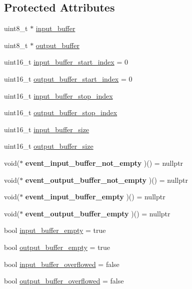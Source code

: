 \subsection*{Protected Attributes}
\begin{DoxyCompactItemize}
\item 
uint8\+\_\+t $\ast$ \hyperlink{class_stream_a81139fc126566f9d42470fdb405ed26a}{input\+\_\+buffer}
\item 
uint8\+\_\+t $\ast$ \hyperlink{class_stream_a3cd072a10ad5c1b6308dd2da2cdbec71}{output\+\_\+buffer}
\item 
uint16\+\_\+t \hyperlink{class_stream_a6fc009e9e71fa92cbbf9b407ede82a73}{input\+\_\+buffer\+\_\+start\+\_\+index} = 0
\item 
uint16\+\_\+t \hyperlink{class_stream_a1b2d63accede402e5c4c7fd3747d4c33}{output\+\_\+buffer\+\_\+start\+\_\+index} = 0
\item 
uint16\+\_\+t \hyperlink{class_stream_aaceece6a2defd1f7d9667fcc0be03a7a}{input\+\_\+buffer\+\_\+stop\+\_\+index}
\item 
uint16\+\_\+t \hyperlink{class_stream_a39d177eedd4d5ff28a95cca9131daf4c}{output\+\_\+buffer\+\_\+stop\+\_\+index}
\item 
uint16\+\_\+t \hyperlink{class_stream_a7373b1d6580a2d5dc74e788b3bb6a596}{input\+\_\+buffer\+\_\+size}
\item 
uint16\+\_\+t \hyperlink{class_stream_a0e9fd6570bafb97ab76ebd37158e78ff}{output\+\_\+buffer\+\_\+size}
\item 
void($\ast$ {\bfseries event\+\_\+input\+\_\+buffer\+\_\+not\+\_\+empty} )() = nullptr\hypertarget{class_stream_a3ab76320116c828e383ef680090718ea}{}\label{class_stream_a3ab76320116c828e383ef680090718ea}

\item 
void($\ast$ {\bfseries event\+\_\+output\+\_\+buffer\+\_\+not\+\_\+empty} )() = nullptr\hypertarget{class_stream_a358e5b988d3ccb204f4d544a24be9e65}{}\label{class_stream_a358e5b988d3ccb204f4d544a24be9e65}

\item 
void($\ast$ {\bfseries event\+\_\+input\+\_\+buffer\+\_\+empty} )() = nullptr\hypertarget{class_stream_a243989d3685da8518601dd901f72dcc1}{}\label{class_stream_a243989d3685da8518601dd901f72dcc1}

\item 
void($\ast$ {\bfseries event\+\_\+output\+\_\+buffer\+\_\+empty} )() = nullptr\hypertarget{class_stream_a0d2e1d5b0cb7b6fb8ed1cff1f264192a}{}\label{class_stream_a0d2e1d5b0cb7b6fb8ed1cff1f264192a}

\item 
bool \hyperlink{class_stream_aff1c899af0d2dea35700d5665f378cd8}{input\+\_\+buffer\+\_\+empty} = true
\item 
bool \hyperlink{class_stream_a54b21caaee0001e44968fb70d0a591f5}{output\+\_\+buffer\+\_\+empty} = true
\item 
bool \hyperlink{class_stream_ae7300cb8941cec142c14e8fc9baab9d3}{input\+\_\+buffer\+\_\+overflowed} = false
\item 
bool \hyperlink{class_stream_a149776fead5c56894699da5bfe489b65}{output\+\_\+buffer\+\_\+overflowed} = false
\end{DoxyCompactItemize}


